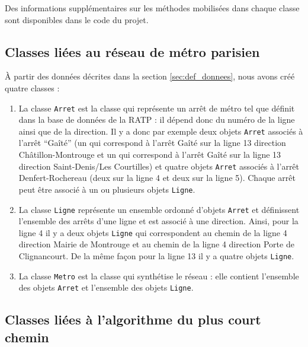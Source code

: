 \documentclass[,french]{article}
\begin{document}
Des informations supplémentaires sur les méthodes mobilisées dans chaque
classe sont disponibles dans le code du projet.

\hypertarget{classes-liuxe9es-au-ruxe9seau-de-muxe9tro-parisien}{%
\subsection{Classes liées au réseau de métro
parisien}\label{classes-liuxe9es-au-ruxe9seau-de-muxe9tro-parisien}}

À partir des données décrites dans la section \ref{sec:def_donnees},
nous avons créé quatre classes :

\begin{enumerate}
\def\labelenumi{\arabic{enumi}.}
\item
  La classe \texttt{Arret} est la classe qui représente un arrêt de
  métro tel que définit dans la base de données de la RATP : il dépend
  donc du numéro de la ligne ainsi que de la direction. Il y a donc par
  exemple deux objets \texttt{Arret} associés à l'arrêt ``Gaîté'' (un
  qui correspond à l'arrêt Gaîté sur la ligne 13 direction
  Châtillon-Montrouge et un qui correspond à l'arrêt Gaîté sur la ligne
  13 direction Saint-Denis/Les Courtilles) et quatre objets
  \texttt{Arret} associés à l'arrêt Denfert-Rochereau (deux sur la ligne
  4 et deux sur la ligne 5). Chaque arrêt peut être associé à un ou
  plusieurs objets \texttt{Ligne}.
\item
  La classe \texttt{Ligne} représente un ensemble ordonné d'objets
  \texttt{Arret} et définissent l'ensemble des arrêts d'une ligne et est
  associé à une direction. Ainsi, pour la ligne 4 il y a deux objets
  \texttt{Ligne} qui correspondent au chemin de la ligne 4 direction
  Mairie de Montrouge et au chemin de la ligne 4 direction Porte de
  Clignancourt. De la même façon pour la ligne 13 il y a quatre objets
  \texttt{Ligne}.
\item
  La classe \texttt{Metro} est la classe qui synthétise le réseau : elle
  contient l'ensemble des objets \texttt{Arret} et l'ensemble des objets
  \texttt{Ligne}.
\end{enumerate}

\hypertarget{classes-liuxe9es-uxe0-lalgorithme-du-plus-court-chemin}{%
\subsection{Classes liées à l'algorithme du plus court
chemin}\label{classes-liuxe9es-uxe0-lalgorithme-du-plus-court-chemin}}
\end{document}

